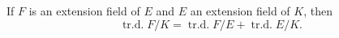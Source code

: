 If $F$ is an extension field of $E$ and $E$ an extension field of $K$, then
\[
\operatorname{tr.d.} F/K = \operatorname{tr.d.} F/E + \operatorname{tr.d.} E/K.
\]
